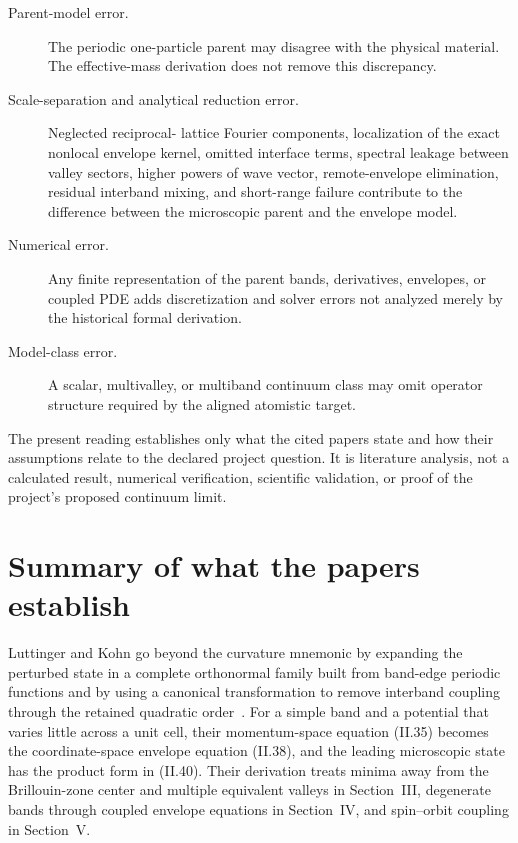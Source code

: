 \begin{description}
  \item[Parent-model error.] The periodic one-particle parent may disagree with
    the physical material. The effective-mass derivation does not remove this
    discrepancy.
  \item[Scale-separation and analytical reduction error.] Neglected reciprocal-
    lattice Fourier components, localization of the exact nonlocal envelope
    kernel, omitted interface terms, spectral leakage between valley sectors,
    higher powers of wave vector, remote-envelope elimination, residual
    interband mixing, and short-range failure contribute
    to the difference between the microscopic parent and the envelope model.
  \item[Numerical error.] Any finite representation of the parent bands,
    derivatives, envelopes, or coupled PDE adds discretization and solver
    errors not analyzed merely by the historical formal derivation.
  \item[Model-class error.] A scalar, multivalley, or multiband continuum class
    may omit operator structure required by the aligned atomistic target.
\end{description}

The present reading establishes only what the cited papers state and how their
assumptions relate to the declared project question. It is literature analysis,
not a calculated result, numerical verification, scientific validation, or
proof of the project's proposed continuum limit.

\section{Summary of what the papers establish}

Luttinger and Kohn go beyond the curvature mnemonic by expanding the perturbed
state in a complete orthonormal family built from band-edge periodic functions
and by using a canonical transformation to remove interband coupling through
the retained quadratic order~\cite{luttingerKohn1955}. For a simple band and a
potential that varies little across a unit cell, their momentum-space equation
(II.35) becomes the coordinate-space envelope equation (II.38), and the leading
microscopic state has the product form in (II.40). Their derivation treats
minima away from the Brillouin-zone center and multiple equivalent valleys in
Section~III, degenerate bands through coupled envelope equations in Section~IV,
and spin--orbit coupling in Section~V.

